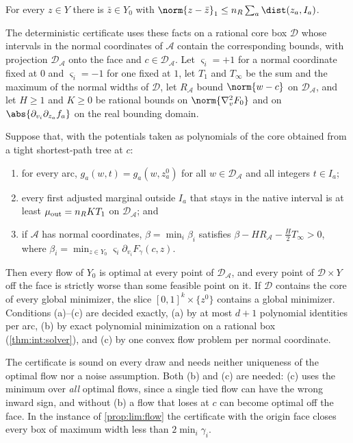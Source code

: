 \begin{lemma}\label{lem:int:proximity}
For every $z\in Y$ there is $\bar z\in Y_0$ with
$\norm{z-\bar z}_1\le n_R\sum_a\dist(z_a,I_a)$.
\end{lemma}

The deterministic certificate uses these facts on a rational core box
$\mathcal D$ whose intervals in the normal coordinates of $\mathcal A$ contain
the corresponding bounds, with projection $\mathcal D_{\mathcal A}$ onto the
face and $c\in\mathcal D_{\mathcal A}$. Let $\varsigma_i=+1$ for a normal
coordinate fixed at $0$ and $\varsigma_i=-1$ for one fixed at $1$, let $T_1$ and
$T_\infty$ be the sum and the maximum of the normal widths of $\mathcal D$, let
$R_{\mathcal A}$ bound $\norm{w-c}$ on $\mathcal D_{\mathcal A}$, and let
$H\ge1$ and $K\ge0$ be rational bounds on $\norm{\nabla^2_vF_0}$ and on
$\abs{\partial_{v_i}\partial_{z_a}f_a}$ on the real bounding domain.

\begin{theorem}\label{thm:int:face}
Suppose that, with the potentials taken as polynomials of the core obtained
from a tight shortest-path tree at $c$:
\begin{enumerate}[label=(\alph*)]
\item for every arc, $g_a(w,t)=g_a(w,z^0_a)$ for all $w\in\mathcal D_{\mathcal A}$
and all integers $t\in I_a$;
\item every first adjusted marginal outside $I_a$ that stays in the native
interval is at least $\mu_{\rm out}=n_RKT_1$ on $\mathcal D_{\mathcal A}$; and
\item if $\mathcal A$ has normal coordinates, $\beta=\min_i\beta_i$ satisfies
$\beta-HR_{\mathcal A}-\frac H2T_\infty>0$, where
$\beta_i=\min_{z\in Y_0}\varsigma_i\partial_{v_i}F_\gamma(c,z)$.
\end{enumerate}
Then every flow of $Y_0$ is optimal at every point of $\mathcal D_{\mathcal A}$,
and every point of $\mathcal D\times Y$ off the face is strictly worse than some
feasible point on it. If $\mathcal D$ contains the core of every global
minimizer, the slice $[0,1]^k\times\{z^0\}$ contains a global minimizer.
Conditions (a)--(c) are decided exactly, (a) by at most $d+1$ polynomial
identities per arc, (b) by exact polynomial minimization on a rational box
(\cref{thm:int:solver}), and (c) by one convex flow problem per normal
coordinate.
\end{theorem}

The certificate is sound on every draw and needs neither uniqueness of the
optimal flow nor a noise assumption. Both (b) and (c) are needed: (c) uses the
minimum over \emph{all} optimal flows, since a single tied flow can have the
wrong inward sign, and without (b) a flow that loses at $c$ can become optimal
off the face. In the instance of \cref{prop:lim:flow} the certificate with the origin
face closes every box of maximum width less than $2\min_i\gamma_i$.

